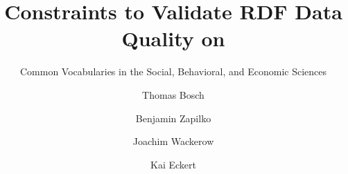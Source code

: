 \documentclass{llncs}
\begin{document}
\renewcommand{\arraystretch}{1.3}
%
%
\title{Constraints to Validate RDF Data Quality on}
\subtitle{Common Vocabularies in the Social, Behavioral, and Economic Sciences}

%
\author{Thomas Bosch \and Benjamin Zapilko \and Joachim Wackerow \and Kai Eckert}
%
\authorrunning{} %
%

\maketitle              %
\end{document}
